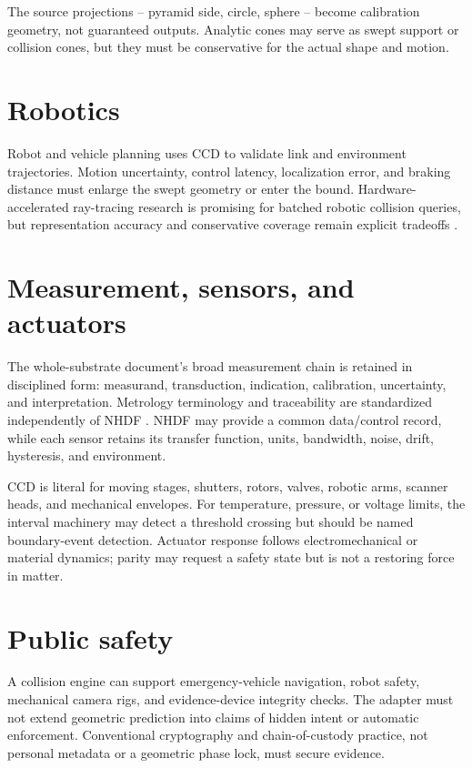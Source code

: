 \documentclass[11pt,a4paper,openany]{book}
\begin{document}
The source projections -- pyramid side, circle, sphere -- become calibration geometry, not guaranteed outputs. Analytic cones may serve as swept support or collision cones, but they must be conservative for the actual shape and motion.

\section{Robotics}
Robot and vehicle planning uses CCD to validate link and environment trajectories. Motion uncertainty, control latency, localization error, and braking distance must enlarge the swept geometry or enter the bound. Hardware-accelerated ray-tracing research is promising for batched robotic collision queries, but representation accuracy and conservative coverage remain explicit tradeoffs \citep{sui2024rtccd}.

\section{Measurement, sensors, and actuators}
The whole-substrate document's broad measurement chain is retained in disciplined form: measurand, transduction, indication, calibration, uncertainty, and interpretation. Metrology terminology and traceability are standardized independently of NHDF \citep{jcgm2012vim}. NHDF may provide a common data/control record, while each sensor retains its transfer function, units, bandwidth, noise, drift, hysteresis, and environment.

CCD is literal for moving stages, shutters, rotors, valves, robotic arms, scanner heads, and mechanical envelopes. For temperature, pressure, or voltage limits, the interval machinery may detect a threshold crossing but should be named boundary-event detection. Actuator response follows electromechanical or material dynamics; parity may request a safety state but is not a restoring force in matter.

\section{Public safety}
A collision engine can support emergency-vehicle navigation, robot safety, mechanical camera rigs, and evidence-device integrity checks. The adapter must not extend geometric prediction into claims of hidden intent or automatic enforcement. Conventional cryptography and chain-of-custody practice, not personal metadata or a geometric phase lock, must secure evidence.
\end{document}
